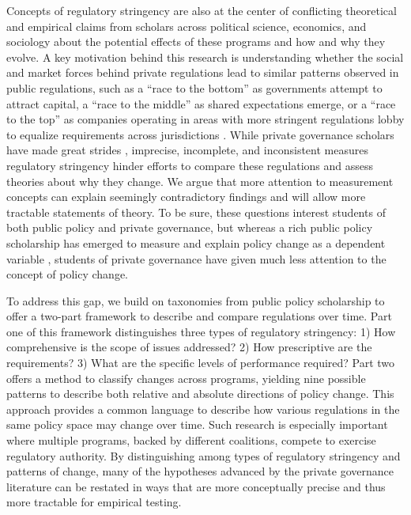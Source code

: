 \documentclass[
      12pt,
            Review ]{article}
\begin{document}
Concepts of regulatory stringency are also at the center of conflicting
theoretical and empirical claims from scholars across political science,
economics, and sociology about the potential effects of these programs
and how and why they evolve. A key motivation behind this research is
understanding whether the social and market forces behind private
regulations lead to similar patterns observed in public regulations,
such as a ``race to the bottom'' as governments attempt to attract
capital, a ``race to the middle'' as shared expectations emerge, or a
``race to the top'' as companies operating in areas with more stringent
regulations lobby to equalize requirements across jurisdictions
\citep{Berger1996, Rodrik2004, Vogel1995}. While private governance
scholars have made great strides \citep{Grabs2018}, imprecise,
incomplete, and inconsistent measures regulatory stringency hinder
efforts to compare these regulations and assess theories about why they
change. We argue that more attention to measurement concepts can explain
seemingly contradictory findings and will allow more tractable
statements of theory. To be sure, these questions interest students of
both public policy and private governance, but whereas a rich public
policy scholarship has emerged to measure and explain policy change as a
dependent variable \citep{Green-Pedersen2007, Hall1993, Howlett2014},
students of private governance have given much less attention to the
concept of policy change.

To address this gap, we build on taxonomies from public policy
scholarship to offer a two-part framework to describe and compare
regulations over time. Part one of this framework distinguishes three
types of regulatory stringency: 1) How comprehensive is the scope of
issues addressed? 2) How prescriptive are the requirements? 3) What are
the specific levels of performance required? Part two offers a method to
classify changes across programs, yielding nine possible patterns to
describe both relative and absolute directions of policy change. This
approach provides a common language to describe how various regulations
in the same policy space may change over time. Such research is
especially important where multiple programs, backed by different
coalitions, compete to exercise regulatory authority. By distinguishing
among types of regulatory stringency and patterns of change, many of the
hypotheses advanced by the private governance literature can be restated
in ways that are more conceptually precise and thus more tractable for
empirical testing.
\end{document}
